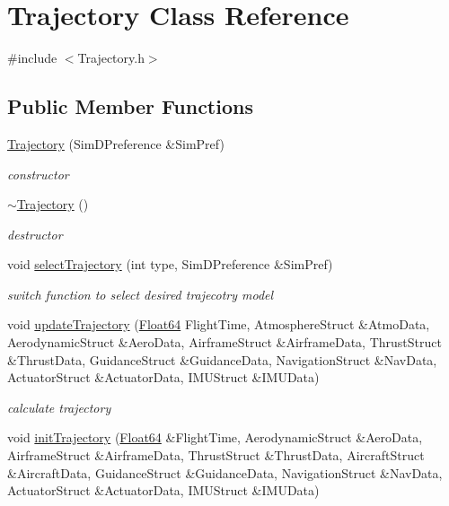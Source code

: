 \hypertarget{class_trajectory}{}\section{Trajectory Class Reference}
\label{class_trajectory}


{\ttfamily \#include $<$Trajectory.\+h$>$}

\subsection*{Public Member Functions}
\begin{DoxyCompactItemize}
\item 
\hyperlink{class_trajectory_a8d2001c718f24b178ca0dd84ec1a3960}{Trajectory} (Sim\+D\+Preference \&Sim\+Pref)
\begin{DoxyCompactList}\small\item\em constructor \end{DoxyCompactList}\item 
\hyperlink{class_trajectory_ac673c37025ca5353ad99ab41c936e75d}{$\sim$\+Trajectory} ()
\begin{DoxyCompactList}\small\item\em destructor \end{DoxyCompactList}\item 
void \hyperlink{class_trajectory_a4db29356942a4625c45848eb4e4ae5c8}{select\+Trajectory} (int type, Sim\+D\+Preference \&Sim\+Pref)
\begin{DoxyCompactList}\small\item\em switch function to select desired trajecotry model \end{DoxyCompactList}\item 
void \hyperlink{class_trajectory_acc91a96613419c3f72c43073c3ccda5d}{update\+Trajectory} (\hyperlink{group___tools_ga3f1431cb9f76da10f59246d1d743dc2c}{Float64} Flight\+Time, Atmosphere\+Struct \&Atmo\+Data, Aerodynamic\+Struct \&Aero\+Data, Airframe\+Struct \&Airframe\+Data, Thrust\+Struct \&Thrust\+Data, Guidance\+Struct \&Guidance\+Data, Navigation\+Struct \&Nav\+Data, Actuator\+Struct \&Actuator\+Data, I\+M\+U\+Struct \&I\+M\+U\+Data)
\begin{DoxyCompactList}\small\item\em calculate trajectory \end{DoxyCompactList}\item 
void \hyperlink{class_trajectory_a1cfa48216ff480563708998e3b8dab5f}{init\+Trajectory} (\hyperlink{group___tools_ga3f1431cb9f76da10f59246d1d743dc2c}{Float64} \&Flight\+Time, Aerodynamic\+Struct \&Aero\+Data, Airframe\+Struct \&Airframe\+Data, Thrust\+Struct \&Thrust\+Data, Aircraft\+Struct \&Aircraft\+Data, Guidance\+Struct \&Guidance\+Data, Navigation\+Struct \&Nav\+Data, Actuator\+Struct \&Actuator\+Data, I\+M\+U\+Struct \&I\+M\+U\+Data)

\end{DoxyCompactItemize}
